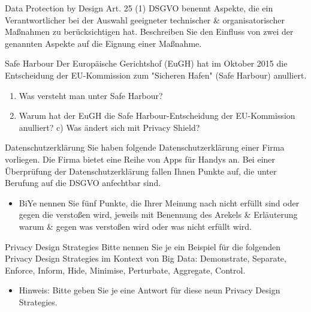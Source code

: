 \documentclass{exercisesheet}
\begin{document}
  \begin{exercise*}{Data Protection by Design}
    Art. 25 (1) DSGVO benennt Aspekte, die ein Verantwortlicher bei der Auswahl geeigneter technischer \& organisatorischer Maßnahmen zu berücksichtigen hat. Beschreiben Sie den Einfluss von zwei der genannten Aspekte auf die Eignung einer Maßnahme.
  \end{exercise*}

  \begin{exercise*}{Safe Harbour}
    Der Europäische Gerichtshof (EuGH) hat im Oktober 2015 die Entscheidung der EU-Kommission zum "Sicheren Hafen" (Safe Harbour) anulliert.
    \begin{enumerate}
      \item Was versteht man unter Safe Harbour?
      \item Warum hat der EuGH die Safe Harbour-Entscheidung der EU-Kommission anulliert? c) Was ändert sich mit Privacy Shield?
    \end{enumerate}
  \end{exercise*}

  \begin{exercise*}{Datenschutzerklärung}
    Sie haben folgende Datenschutzerklärung einer Firma vorliegen. Die Firma bietet eine Reihe von Apps für Handys an. Bei einer Überprüfung der Datenschutzerklärung fallen Ihnen Punkte auf, die unter Berufung auf die DSGVO anfechtbar sind.
    \begin{itemize}
      \item BiYe nennen Sie fünf Punkte, die Ihrer Meinung nach nicht erfüllt sind oder gegen die verstoßen wird, jeweils mit Benennung des Arekels \& Erläuterung warum \& gegen was verstoßen wird oder was nicht erfüllt wird.
    \end{itemize}
  \end{exercise*}

  \begin{exercise*}{Privacy Design Strategies}
    Bitte nennen Sie je ein Beispiel für die folgenden Privacy Design Strategies im Kontext von Big Data: Demonstrate, Separate, Enforce, Inform, Hide, Minimise, Perturbate, Aggregate, Control.
    \begin{itemize}
      \item Hinweis: Bitte geben Sie je eine Antwort für diese neun Privacy Design Strategies.
    \end{itemize}
  \end{exercise*}
\end{document}
